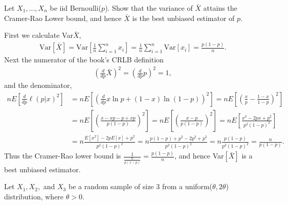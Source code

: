 \documentclass[12pt,letterpaper]{exam}
\begin{document}
\begin{questions}
\begin{solution}
\begin{parts}
		\end{parts}
	\end{solution}
	
\clearpage

\setcounter{question}{40-1}
\question Let $X_1,...,X_n$ be iid Bernoulli($p$). Show that the variance of $\bar{X}$ attains the Cramer-Rao Lower bound, and hence $\bar{X}$ is the best unbiased estimator of $p$.
	\begin{solution}
		First we calculate Var\(\bar{X}\),
		\begin{align*}
			\text{Var}[\bar{X}]
			= \text{Var}\left[\frac{1}{n}\sum_{i=1}^{n}x_i\right]
			= \frac{1}{n}\sum_{i=1}^{n}\text{Var}[x_i]
			= \frac{p(1-p)}{n}.
		\end{align*}
		Next the numerator of the book's CRLB definition
		\begin{align*}
			\left(\frac{d}{dp}\bar{X}\right)^2
			=\left(\frac{d}{dp}p\right)^2
			=1,
		\end{align*}
		and the denominator, 
		\begin{align*}
			nE\left[\frac{d}{dp}\ell(p|x)^2\right] &
			= nE\left[\left(\frac{d}{dp}x\ln p + (1-x)\ln(1-p)\right)^2\right]
			= nE\left[\left(\frac{x}{p} - \frac{1-x}{1-p}\right)^2\right] \\&
			= nE\left[\left(\frac{x-xp-p+xp}{p(1-p)}\right)^2\right]
			= nE\left[\left(\frac{x-p}{p(1-p)}\right)^2\right]
			= nE\left[\frac{x^2-2px+p^2}{p^2(1-p)^2}\right] \\&
			= n\frac{E[x^2]-2pE[x]+p^2}{p^2(1-p)^2}
			= n\frac{p(1-p)+p^2-2p^2+p^2}{p^2(1-p)^2}
			= n\frac{p(1-p)}{p^2(1-p)^2}
			= \frac{n}{p(1-p)}.
		\end{align*}
		Thus the Cramer-Rao lower bound is
		\(\frac{1}{\frac{n}{p(1-p)}} = \frac{p(1-p)}{n}\),
		and hence Var\([\bar{X}]\) is a best unbiased estimator.
	\end{solution}

\setcounter{question}{46-1}
\question Let $X_1, X_2,$ and $X_3$ be a random sample of size 3 from a uniform($\theta, 2\theta$) distribution, where $\theta >0$.
\end{questions}
\end{document}
